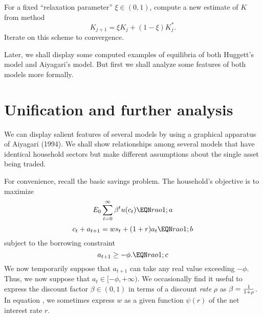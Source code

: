 \medskip
{} For a fixed ``relaxation parameter'' $\xi \in (0,1)$,
compute a new estimate of $K$ from method
$$ K_{j+1} = \xi K_j + (1-\xi) K_j^* .$$
\medskip
{} Iterate on this scheme to convergence.

\medskip
Later, we shall display some computed examples of
equilibria of both Huggett's model and Aiyagari's model.
But first we shall analyze some features of both models
more formally.

\section{Unification and further analysis}\label{sec:unif}%
     We can display salient features of several models by using
a graphical apparatus of Aiyagari (1994).  We shall
show relationships  among several
models that have identical household sectors but
make different assumptions about the single asset being traded.

  For convenience, recall the basic savings problem.
 The household's objective is to maximize
$$ E_0 \sum_{t=0}^\infty \beta^t u(c_t)  \EQN rao1;a $$
$$ c_t + a_{t+1} = w s_t + (1+r) a_t  \EQN rao1;b $$
subject to the borrowing constraint
$$ a_{t+1} \geq -  \phi . \EQN rao1;c $$
We now temporarily suppose that $a_{t+1}$ can take any
real value   exceeding $-\phi$.    Thus, we now suppose
that $a_t \in [-\phi, + \infty)$.
We occasionally  find it useful to express the discount factor
$\beta \in (0,1)$ in terms of a discount {\it rate\/}
$\rho$ as $\beta = {1 \over 1+ \rho}$.
In equation , we sometimes express $w$ as a given function
$\psi(r)$ of the net interest rate $r$.

